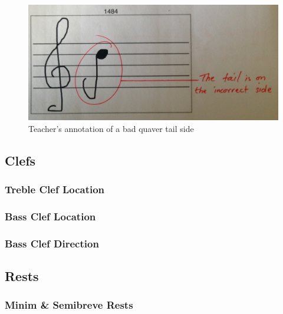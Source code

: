 \begin{figure}[H]
  \includegraphics[width=\linewidth]{gfx/photos/teacher-bad-quavertail-side.jpg}
  \caption{Teacher's annotation of a bad quaver tail side}
  \label{fig:teacher-example-quaver-wrong-side}
\end{figure}

\subsection{Clefs}

\subsubsection{Treble Clef Location}\label{sec:tf-treble-clef-location}

\subsubsection{Bass Clef Location}\label{sec:tf-bass-clef-location}

\subsubsection{Bass Clef Direction}\label{sec:tf-bass-clef-direction}

\subsection{Rests}

\subsubsection{Minim \& Semibreve Rests}\label{sec:tf-minim-rest}

